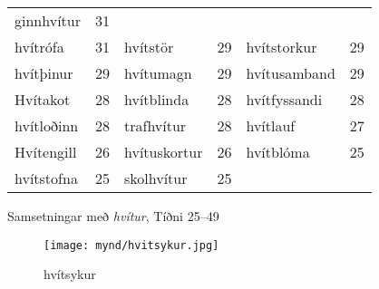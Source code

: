 \documentclass{../litmal.tex}{subfiles}
\begin{document}
\begin{wordlist}[H]
\begin{tcolorbox}
\begin{tabular}{BlBlBl}
		ginnhvítur	& 31		\\ 
		hvítrófa		& 31		& 
		hvítstör		& 29		& 
		hvítstorkur	& 29		\\ 
		hvítþinur		& 29		& 
		hvítumagn	& 29		& 	
		hvítusamband & 29		\\ 
		Hvítakot		& 28		& 
		hvítblinda	& 28		& 
		hvítfyssandi 	& 28		\\ 
		hvítloðinn	& 28		& 	
		trafhvítur	& 28		& 
		hvítlauf		& 27		\\ 
		Hvítengill	& 26		& 
		hvítuskortur	& 26		& 
		hvítblóma	& 25		\\ 
		hvítstofna	& 25		& 	
		skolhvítur	& 25		& 
					&
	\end{tabular}

\end{tcolorbox}
	\caption{Samsetningar með \textit{hvítur}, Tíðni 25--49}
	\label{listi:hvitt.25}
\end{wordlist}	
		
\begin{figure}[H]
\begin{tcolorbox}
\centering
	\texttt{[image: mynd/hvitsykur.jpg]}
\end{tcolorbox}
	\caption{hvítsykur}
	\label{mynd:hvitsykur}
\end{figure}		
		
\end{document}
